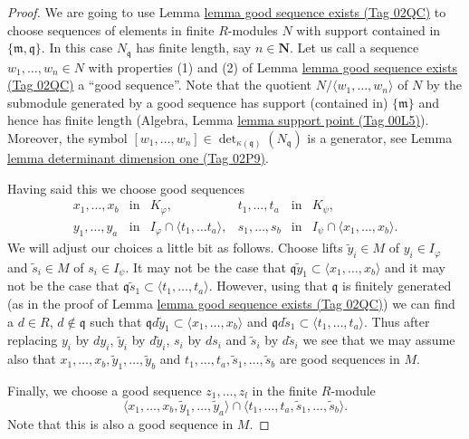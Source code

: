 \documentclass{amsart}
\theoremstyle{plain}
\theoremstyle{definition}
\theoremstyle{remark}
\numberwithin{equation}{subsection}
\begin{document}
\begin{proof}
\medskip\noindent
We are going to use Lemma \href{https://stacks.math.columbia.edu/tag/02QC}{lemma good sequence exists (Tag 02QC)}
to choose sequences of elements in finite $R$-modules
$N$ with support contained in $\{\mathfrak m, \mathfrak q\}$.
In this case $N_{\mathfrak q}$ has finite length, say $n \in \mathbf{N}$.
Let us call a sequence $w_1, \ldots, w_n \in N$
with properties (1) and (2) of Lemma \href{https://stacks.math.columbia.edu/tag/02QC}{lemma good sequence exists (Tag 02QC)}
a ``good sequence''. Note that the quotient
$N/\langle w_1, \ldots, w_n \rangle$ of $N$ by the submodule generated by
a good sequence has support (contained in) $\{\mathfrak m\}$
and hence has finite length (Algebra, Lemma \href{https://stacks.math.columbia.edu/tag/00L5}{lemma support point (Tag 00L5)}).
Moreover, the symbol
$[w_1, \ldots, w_n] \in \det_{\kappa(\mathfrak q)}(N_{\mathfrak q})$
is a generator, see Lemma \href{https://stacks.math.columbia.edu/tag/02P9}{lemma determinant dimension one (Tag 02P9)}.

\medskip\noindent
Having said this we choose good sequences
$$
\begin{matrix}
x_1, \ldots, x_b & \text{in} & K_\varphi, &
t_1, \ldots, t_a & \text{in} & K_\psi, \\
y_1, \ldots, y_a & \text{in} & I_\varphi \cap \langle t_1, \ldots t_a\rangle, &
s_1, \ldots, s_b & \text{in} & I_\psi \cap \langle x_1, \ldots, x_b\rangle.
\end{matrix}
$$
We will adjust our choices a little bit as follows.
Choose lifts $\tilde y_i \in M$ of $y_i \in I_\varphi$
and $\tilde s_i \in M$ of $s_i \in I_\psi$. It may not be the case
that $\mathfrak q \tilde y_1 \subset \langle x_1, \ldots, x_b\rangle$
and it may not be the case that
$\mathfrak q \tilde s_1 \subset \langle t_1, \ldots, t_a\rangle$.
However, using that $\mathfrak q$ is finitely generated (as in the proof
of Lemma \href{https://stacks.math.columbia.edu/tag/02QC}{lemma good sequence exists (Tag 02QC)}) we can find a
$d \in R$, $d \not \in \mathfrak q$ such that
$\mathfrak q d\tilde y_1 \subset \langle x_1, \ldots, x_b\rangle$
and
$\mathfrak q d\tilde s_1 \subset \langle t_1, \ldots, t_a\rangle$.
Thus after replacing $y_i$ by $dy_i$,
$\tilde y_i$ by $d\tilde y_i$, $s_i$ by $ds_i$ and $\tilde s_i$
by $d\tilde s_i$ we see that we may assume also that
$x_1, \ldots, x_b, \tilde y_1, \ldots, \tilde y_b$
and $t_1, \ldots, t_a, \tilde s_1, \ldots, \tilde s_b$
are good sequences in $M$.

\medskip\noindent
Finally, we choose a good sequence
$z_1, \ldots, z_l$ in the finite $R$-module
$$
\langle
x_1, \ldots, x_b, \tilde y_1, \ldots, \tilde y_a
\rangle
\cap
\langle
t_1, \ldots, t_a, \tilde s_1, \ldots, \tilde s_b
\rangle.
$$
Note that this is also a good sequence in $M$.


\end{proof}
\end{document}
